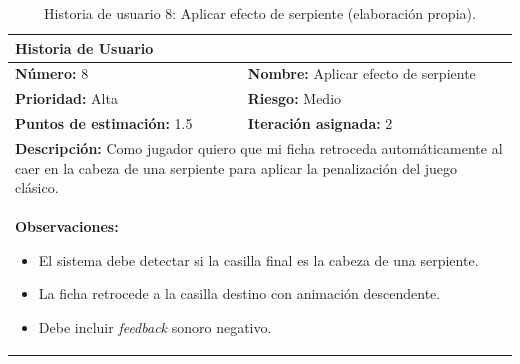 \begin{table}[H]
\centering
\caption{Historia de usuario 8: Aplicar efecto de serpiente (elaboración propia).\label{tab:hu8}}
\renewcommand{\arraystretch}{1.5}
\begin{tabular}{|p{}|p{}|}
\hline
\multicolumn{2}{|l|}{\textbf{Historia de Usuario}} \\
\hline
\textbf{Número:} 8 & \textbf{Nombre:} Aplicar efecto de serpiente \\
\hline
\textbf{Prioridad:} Alta & \textbf{Riesgo:} Medio \\
\hline
\textbf{Puntos de estimación:} 1.5 & \textbf{Iteración asignada:} 2 \\
\hline
\multicolumn{2}{|p{0.945\textwidth}|}{\textbf{Descripción:} Como jugador quiero que mi ficha retroceda automáticamente al caer en la cabeza de una serpiente para aplicar la penalización del juego clásico.} \\
\hline
\multicolumn{2}{|p{0.945\textwidth}|}{\textbf{Observaciones:}
\vspace{-0.5em}
\begin{itemize}
    \setlength\itemsep{0em}
    \item El sistema debe detectar si la casilla final es la cabeza de una serpiente.
    \item La ficha retrocede a la casilla destino con animación descendente.
    \item Debe incluir \textit{feedback} sonoro negativo.
\end{itemize}
\vspace{-1em}
} \\
\hline
\end{tabular}
\end{table}

